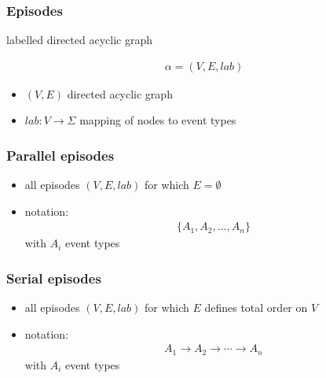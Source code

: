 \documentclass[dvipsnames]{beamer}
\begin{document}
\begin{frame}
\frametitle{Episodes}

labelled directed acyclic graph

\begin{align*}\alpha=(V, E, lab)\end{align*}

\begin{itemize}
\item $ (V, E) $ directed acyclic graph
\item $ lab : V \to \Sigma $ mapping of nodes to event types
\end{itemize}

\end{frame}
\begin{frame}
\frametitle{Parallel episodes}

\begin{itemize}
\item all episodes $ (V, E, lab) $ for which $ E = \emptyset $
\item notation: \begin{align*} \{ A_1, A_2, \ldots, A_n \} \end{align*} with $ A_i $ event types
\end{itemize}

\end{frame}
\begin{frame}
\large
\begin{center}
\end{center}

\end{frame}
\begin{frame}
\frametitle{Serial episodes}

\begin{itemize}
\item all episodes $ (V, E, lab) $ for which $ E $ defines total order on $ V $
\item notation: \begin{align*} A_1 \to A_2 \to \cdots \to A_n \end{align*} with $ A_i $ event types
\end{itemize}

\end{frame}
\end{document}

